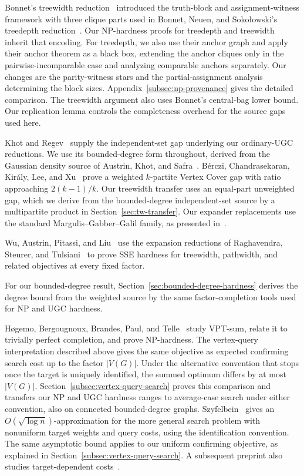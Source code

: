 Bonnet's treewidth reduction~\cite{BonnetTreewidth} introduced the
truth-block and assignment-witness framework with three clique parts
used in Bonnet, Neuen, and Soko\l owski's treedepth reduction~\cite{BNS}.
Our NP-hardness proofs for treedepth and treewidth inherit that encoding.
For treedepth, we also use their anchor graph and apply their anchor theorem
as a black box, extending the anchor cliques only in the pairwise-incomparable
case and analyzing comparable anchors separately. Our changes are the
parity-witness stars and the partial-assignment analysis determining
the block sizes. Appendix~\ref{subsec:np-provenance} gives the detailed
comparison. The treewidth argument also uses Bonnet's central-bag
lower bound. Our replication lemma controls
the completeness overhead for the source gaps used here.

Khot and Regev~\cite{KhotRegev} supply the independent-set gap underlying
our ordinary-UGC reductions. We use its bounded-degree form throughout,
derived from the Gaussian density source of Austrin, Khot, and
Safra~\cite{AKS2011}. B\'erczi, Chandrasekaran, Kir\'aly, Lee,
and Xu~\cite[Sections~3.5--3.6]{BCKLX2017} prove a weighted $k$-partite
Vertex Cover gap with ratio approaching $2(k-1)/k$. Our treewidth
transfer uses an equal-part unweighted gap, which we derive from
the bounded-degree independent-set source by a multipartite product in
Section~\ref{sec:tw-transfer}. Our expander replacements use the
standard Margulis--Gabber--Galil family, as presented
in~\cite[Construction~8.1 and Theorem~8.2]{HLW2006}.

Wu, Austrin, Pitassi, and Liu~\cite{APW} use the expansion reductions
of Raghavendra, Steurer, and Tulsiani~\cite{RST} to prove SSE hardness
for treewidth, pathwidth, and related objectives at every fixed factor.

For our
bounded-degree result, Section~\ref{sec:bounded-degree-hardness}
derives the degree bound from the weighted source by the same
factor-completion tools used for NP and UGC hardness.

H\o gemo, Bergougnoux, Brandes, Paul, and Telle~\cite{HogemoEtAl2021}
study VPT-sum, relate it to trivially perfect completion, and prove
NP-hardness. The vertex-query interpretation described above gives
the same objective as expected confirming search cost up to the factor
$|V(G)|$. Under the alternative convention that stops once the target
is uniquely identified, the summed optimum differs by at most $|V(G)|$.
Section~\ref{subsec:vertex-query-search} proves this comparison and
transfers our NP and UGC hardness ranges to average-case search under
either convention, also on connected bounded-degree graphs.
Szyfelbein~\cite{Szyfelbein2025GraphSearch} gives an
$O(\sqrt{\log n})$-approximation for the more general search
problem with nonuniform target weights and query costs, using the
identification convention. The same asymptotic bound applies to our
uniform confirming objective, as explained in
Section~\ref{subsec:vertex-query-search}. A subsequent
preprint also studies target-dependent costs~\cite{Szyfelbein2026GraphSearch}.

